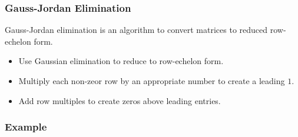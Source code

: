 \documentclass[12pt]{report}
\begin{document}
\begin{flushleft}
\subsubsection*{Gauss-Jordan Elimination}

Gauss-Jordan elimination is an algorithm to convert matrices to reduced
row-echelon form. 
\begin{itemize}
  \item Use Gaussian elimination to reduce to row-echelon form.
  \item Multiply each non-zeor row by an appropriate number to create a
      leading \(1\).
  \item Add row multiples to create zeros above leading entries.
\end{itemize}

\subsubsection*{Example}


\end{flushleft}
\end{document}
